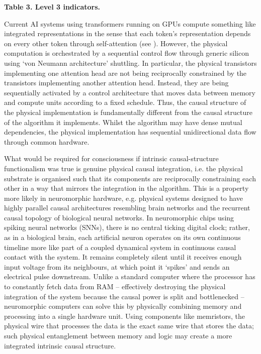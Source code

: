 \documentclass[11pt, a4paper, onecolumn, gdm]{google}
\begin{document}
\textbf{Table 3. Level 3 indicators.}

Current AI systems using transformers running on GPUs compute something like integrated representations in the sense that each token's representation depends on every other token through self-attention (see ).
However, the physical computation is orchestrated by a sequential control flow through generic silicon using `von Neumann architecture' shuttling.
In particular, the physical transistors implementing one attention head are not being reciprocally constrained by the transistors implementing another attention head.
Instead, they are being sequentially activated by a control architecture that moves data between memory and compute units according to a fixed schedule.
Thus, the causal structure of the physical implementation is fundamentally different from the causal structure of the algorithm it implements.
Whilst the algorithm may have dense mutual dependencies, the physical implementation has sequential unidirectional data flow through common hardware.

What would be required for consciousness if intrinsic causal-structure functionalism was true is genuine physical causal integration, i.e. the physical substrate is organised such that its components are reciprocally constraining each other in a way that mirrors the integration in the algorithm.
This is a property more likely in neuromorphic hardware, e.g. physical systems designed to have highly parallel causal architectures resembling brain networks and the recurrent causal topology of biological neural networks.
In neuromorphic chips using spiking neural networks (SNNs), there is no central ticking digital clock; rather, as in a biological brain, each artificial neuron operates on its own continuous timeline more like part of a coupled dynamical system in continuous causal contact with the system.
It remains completely silent until it receives enough input voltage from its neighbours, at which point it `spikes' and sends an electrical pulse downstream.
Unlike a standard computer where the processor has to constantly fetch data from RAM -- effectively destroying the physical integration of the system because the causal power is split and bottlenecked -- neuromorphic computers can solve this by physically combining memory and processing into a single hardware unit.
Using components like memristors, the physical wire that processes the data is the exact same wire that stores the data; such physical entanglement between memory and logic may create a more integrated intrinsic causal structure.
\end{document}
